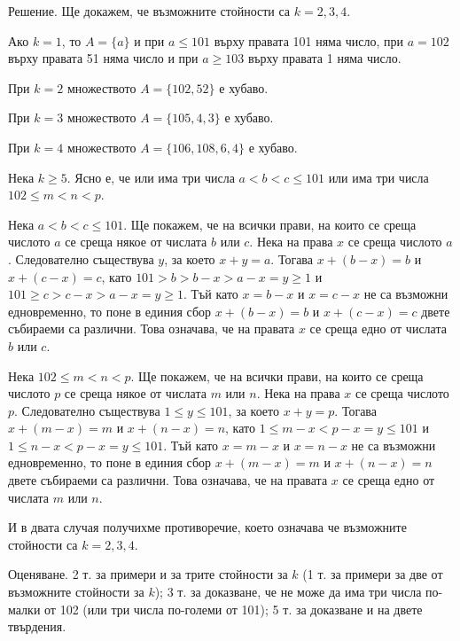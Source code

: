 Решение. Ще докажем, че възможните стойности са $k=2,3,4$.

Ако $k=1$, то $A=\{a\}$ и при $a\le101$ върху правата 101 няма число, при $a=102$ върху правата 51 няма число и при $a\ge103$ върху правата 1 няма число.

При $k=2$ множеството $A=\{102,52\}$ е хубаво.

При $k=3$ множеството $A=\{105,4,3\}$ е хубаво.

При $k=4$ множеството $A=\{106,108,6,4\}$ е хубаво.

Нека $k\ge5$. Ясно е, че или има три числа $a<b<c\le101$ или има три числа $102\le m<n<p$.

Нека $a<b<c\le101$. Ще покажем, че на всички прави, на които се среща числото $a$ се среща някое от числата $b$ или $c$. Нека на права $x$ се среща числото $a$. Следователно съществува $y$, за което $x+y=a$. Тогава $x+(b-x)=b$ и $x+(c-x)=c$, като $101>b>b-x>a-x=y\ge1$ и $101\ge c>c-x>a-x=y\ge1$. Тъй като $x=b-x$ и $x=c-x$ не са възможни едновременно, то поне в единия сбор $x+(b-x)=b$ и $x+(c-x)=c$ двете събираеми са различни. Това означава, че на правата $x$ се среща едно от числата $b$ или $c$.

Нека $102\le m<n<p$. Ще покажем, че на всички прави, на които се среща числото $p$ се среща някое от числата $m$ или $n$. Нека на права $x$ се среща числото $p$. Следователно съществува $1\le y\le101$, за което $x+y=p$. Тогава $x+(m-x)=m$ и $x+(n-x)=n$, като $1\le m-x<p-x=y\le101$ и $1\le n-x<p-x=y\le101$. Тъй като $x=m-x$ и $x=n-x$ не са възможни едновременно, то поне в единия сбор $x+(m-x)=m$ и $x+(n-x)=n$ двете събираеми са различни. Това означава, че на правата $x$ се среща едно от числата $m$ или $n$.

И в двата случая получихме противоречие, което означава че възможните стойности са $k=2,3,4$.

Оценяване. 2 т. за примери и за трите стойности за $k$ (1 т. за примери за две от възможните стойности за $k$); 3 т. за доказване, че не може да има три числа по-малки от 102 (или три числа по-големи от 101); 5 т. за доказване и на двете твърдения.
